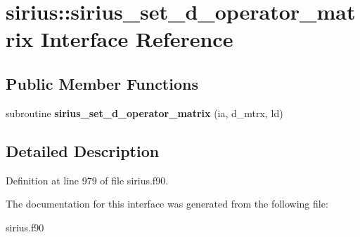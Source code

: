 \hypertarget{interfacesirius_1_1sirius__set__d__operator__matrix}{}\section{sirius\+:\+:sirius\+\_\+set\+\_\+d\+\_\+operator\+\_\+matrix Interface Reference}
\label{interfacesirius_1_1sirius__set__d__operator__matrix}
\subsection*{Public Member Functions}
\begin{DoxyCompactItemize}
\item 
\hypertarget{interfacesirius_1_1sirius__set__d__operator__matrix_aceaab96f3024d5fb51d0376e091762c7}{}subroutine {\bfseries sirius\+\_\+set\+\_\+d\+\_\+operator\+\_\+matrix} (ia, d\+\_\+mtrx, ld)\label{interfacesirius_1_1sirius__set__d__operator__matrix_aceaab96f3024d5fb51d0376e091762c7}

\end{DoxyCompactItemize}


\subsection{Detailed Description}


Definition at line 979 of file sirius.\+f90.



The documentation for this interface was generated from the following file\+:\begin{DoxyCompactItemize}
\item 
sirius.\+f90\end{DoxyCompactItemize}
